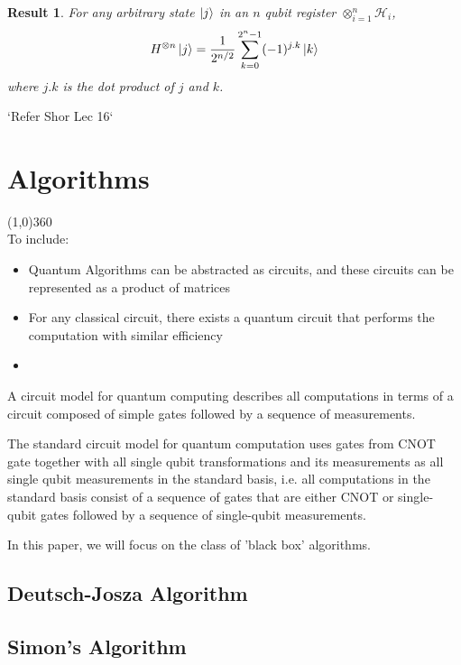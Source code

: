 \documentclass[12pt,twoside,fleqn]{report}
\theoremstyle{thmstyle}
\newtheorem{result}{Result}[chapter]
\begin{document}
\begin{result}
    For any arbitrary state $\ket{j}$ in an $n$ qubit register $\otimes_{i=1}^n \mathcal{H}_i$, \[ H^{\otimes n} \ket{j} = \frac{1}{2^{n/2}} \sum_{k=0}^{2^n-1} (-1)^{j.k} \ket{k}\] where $j.k$ is the dot product of $j$ and $k$.
\end{result}
`Refer Shor Lec 16`

\chapter{Algorithms}

\line(1,0){360} \\

To include:
\begin{itemize}
\item Quantum Algorithms can be abstracted as circuits, and these circuits can be represented as a product of matrices
\item For any classical circuit, there exists a quantum circuit that performs the computation with similar efficiency
\item 
\end{itemize}

A circuit model for quantum computing describes all computations in terms of a circuit composed of simple gates followed by a sequence of measurements.

The standard circuit model for quantum computation uses gates from { CNOT gate together with all single qubit transformations} and its measurements as all single qubit measurements in the standard basis, i.e. all computations in the standard basis consist of a sequence of gates that are either CNOT or single-qubit gates followed by a sequence of single-qubit measurements.

In this paper, we will focus on the class of 'black box' algorithms.

\section{Deutsch-Josza Algorithm}

\section{Simon's Algorithm}
\end{document}
